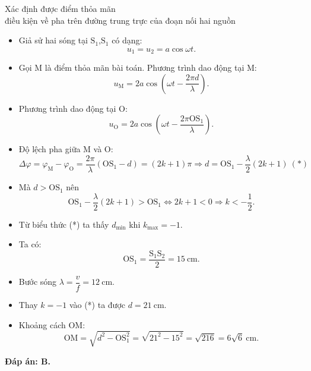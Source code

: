 \begin{dang}{Xác định được điểm thỏa mãn\\ điều kiện về pha trên đường trung trực của đoạn nối hai nguồn}
{		\begin{itemize}
			\item Giả sử hai sóng tại  $\text{S}_1$­,$\text{S}_1$ có dạng:
			\begin{equation*}
				u_1=u_2=a \cos \omega t.
			\end{equation*}
			\item  Gọi M là điểm thỏa mãn bài toán. Phương trình dao động tại M:
			\begin{equation*}
				u_{\text{M}} =2 a \cos \left(\omega t -\dfrac{2\pi d}{\lambda}\right).
			\end{equation*}
			\item Phương trình dao động tại O:
			\begin{equation*}
				u_{\text{O}} =2 a \cos \left(\omega t -\dfrac{2\pi \text{OS}_1}{\lambda}\right).
			\end{equation*}
			\item Độ lệch pha giữa M và O:
			\begin{equation*}
				\Delta \varphi = \varphi_{\text{M}} -\varphi_{\text{O}} = \dfrac{2\pi}{\lambda}(\text{OS}_1-d)=(2k+1) \pi \Rightarrow d = \text{OS}_1 - \dfrac{\lambda}{2}(2k+1)\ (*)
			\end{equation*}
			\item Mà $d>\text{OS}_1$ nên
			\begin{equation*}
				\text{OS}_1 - \dfrac{\lambda}{2}(2k+1) >\text{OS}_1 \Leftrightarrow 2k+1 <0 \Rightarrow  k < - \dfrac{1}{2}.
			\end{equation*}
			\item Từ biểu thức (*) ta thấy $d_{\text{min}}$ khi $k_{\text{max}} = -1$.
			\item Ta có:
			\begin{equation*}
				\text{OS}_1=\dfrac{\text{S}_1\text{S}_2}{2} =15\ \text{cm}.
			\end{equation*}
			\item Bước sóng $\lambda =\dfrac{v}{f} = 12\ \text{cm}$.
			\item Thay $k=-1$ vào (*) ta được $d =21\ \text{cm}$.
			\item Khoảng cách OM:
			\begin{equation*}
				\text{OM} =\sqrt{d^2-\text{OS}_1^2} = \sqrt{21^2-15^2}=\sqrt {216}=6\sqrt 6\ \text{cm}. 
			\end{equation*}
		\end{itemize}
		\textbf{Đáp án: B.}
	}
\end{dang}

